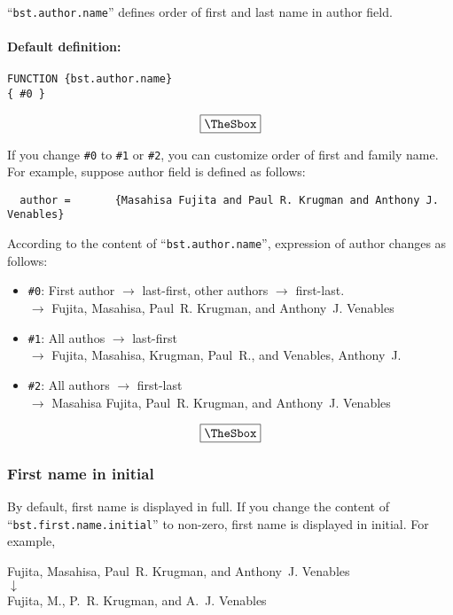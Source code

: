 \documentclass[10pt]{article}
\newenvironment{Frame}%
{\setlength{\fboxsep}{15pt}
\setlength{\mylength}{\linewidth}%
\addtolength{\mylength}{-2\fboxsep}%
\addtolength{\mylength}{-2\fboxrule}%
\Sbox
\minipage{\mylength}%
\setlength{\abovedisplayskip}{0pt}%
\setlength{\belowdisplayskip}{0pt}%
}%
{\endminipage\endSbox
\[\fbox{\TheSbox}\]}
\begin{document}
``\texttt{bst.author.name}'' defines order of first and last name in author field.

\paragraph{Default definition:}
\begin{Frame}
\begin{verbatim}
FUNCTION {bst.author.name}
{ #0 }
\end{verbatim}
\end{Frame}

If you change \verb|#0| to \verb|#1| or \verb|#2|, you can customize
order of first and family name.  For example, suppose author field is
defined as follows:
\begin{verbatim}
  author =       {Masahisa Fujita and Paul R. Krugman and Anthony J. Venables}
\end{verbatim}

According to the content of ``\texttt{bst.author.name}'', expression of
author changes as follows:
\begin{Frame}
\begin{itemize}
 \item \verb|#0|: First author $\rightarrow$ last-first, other authors
       $\rightarrow$ first-last.\\
       $\rightarrow$ Fujita, Masahisa, Paul~R. Krugman, and
       Anthony~J. Venables
 \item \verb|#1|: All authos $\rightarrow$ last-first \\
       $\rightarrow$ Fujita, Masahisa, Krugman, Paul~R., and Venables, Anthony~J.
 \item \verb|#2|: All authors $\rightarrow$ first-last \\
       $\rightarrow$ Masahisa Fujita, Paul~R. Krugman, and Anthony~J. Venables
\end{itemize}
\end{Frame}

\subsubsection{First name in initial}

By default, first name is displayed in full.  If you change the content
of ``\texttt{bst.first.name.initial}'' to non-zero, first name is displayed
in initial.  For example,
\begin{center}
Fujita, Masahisa, Paul~R. Krugman, and Anthony~J. Venables \\
 $\downarrow$ \\
Fujita, M., P.~R. Krugman, and A.~J. Venables
\end{center}
\end{document}
